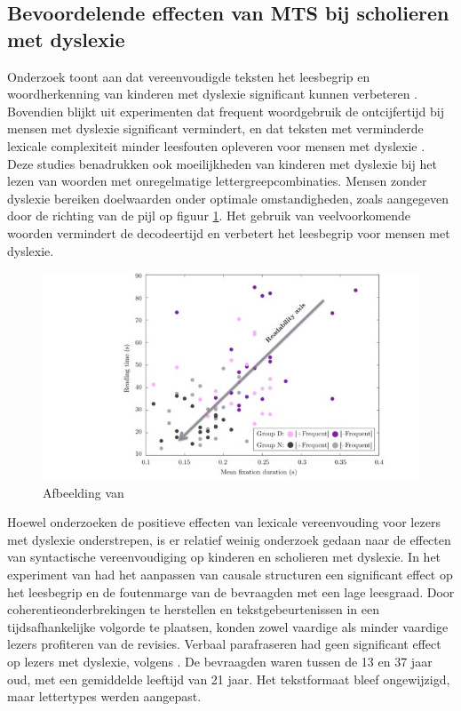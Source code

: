\subsection{Bevoordelende effecten van MTS bij scholieren met dyslexie}

Onderzoek toont aan dat vereenvoudigde teksten het leesbegrip en woordherkenning van kinderen met dyslexie significant kunnen verbeteren \autocite{RiveroContreras2021}. Bovendien blijkt uit experimenten dat frequent woordgebruik de ontcijfertijd bij mensen met dyslexie significant vermindert, en dat teksten met verminderde lexicale complexiteit minder leesfouten opleveren voor mensen met dyslexie \autocite{Rello2013a, Gala2016}. Deze studies benadrukken ook moeilijkheden van kinderen met dyslexie bij het lezen van woorden met onregelmatige lettergreepcombinaties. Mensen zonder dyslexie bereiken doelwaarden onder optimale omstandigheden, zoals aangegeven door de richting van de pijl op figuur \ref{img:readability-mean-fixation-duration}. Het gebruik van veelvoorkomende woorden vermindert de decodeertijd en verbetert het leesbegrip voor mensen met dyslexie.

\medspace

\begin{figure}
\includegraphics[width=\linewidth]{img/readability-mean-fixation-duration.png}
\caption{Afbeelding van \textcite{Rello2013a}}
\label{img:readability-mean-fixation-duration}
\end{figure}

\medspace

Hoewel onderzoeken de positieve effecten van lexicale vereenvouding voor lezers met dyslexie onderstrepen, is er relatief weinig onderzoek gedaan naar de effecten van syntactische vereenvoudiging op kinderen en scholieren met dyslexie. In het experiment van \textcite{Linderholm2000} had het aanpassen van causale structuren een significant effect op het leesbegrip en de foutenmarge van de bevraagden met een lage leesgraad. Door coherentieonderbrekingen te herstellen en tekstgebeurtenissen in een tijdsafhankelijke volgorde te plaatsen, konden zowel vaardige als minder vaardige lezers profiteren van de revisies. Verbaal parafraseren had geen significant effect op lezers met dyslexie, volgens \textcite{Rello2013c}. De bevraagden waren tussen de 13 en 37 jaar oud, met een gemiddelde leeftijd van 21 jaar. Het tekstformaat bleef ongewijzigd, maar lettertypes werden aangepast.

